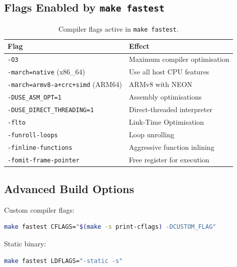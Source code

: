 \subsection{Flags Enabled by \texttt{make fastest}}
\label{sec:quickstart-flags}

\begin{table}[h]
  \centering
  \begin{tabular}{ll}
    \toprule
    Flag & Effect \\
    \midrule
    \texttt{-O3}                              & Maximum compiler optimisation \\
    \texttt{-march=native} (x86\_64)          & Use all host CPU features \\
    \texttt{-march=armv8-a+crc+simd} (ARM64) & ARMv8 with NEON \\
    \texttt{-DUSE\_ASM\_OPT=1}               & Assembly optimisations \\
    \texttt{-DUSE\_DIRECT\_THREADING=1}      & Direct-threaded interpreter \\
    \texttt{-flto}                            & Link-Time Optimisation \\
    \texttt{-funroll-loops}                   & Loop unrolling \\
    \texttt{-finline-functions}               & Aggressive function inlining \\
    \texttt{-fomit-frame-pointer}             & Free register for execution \\
    \bottomrule
  \end{tabular}
  \caption{Compiler flags active in \texttt{make fastest}.}
  \label{tab:quickstart-flags}
\end{table}

\subsection{Advanced Build Options}
\label{sec:quickstart-advanced}

Custom compiler flags:

\begin{lstlisting}[language=bash]
make fastest CFLAGS="$(make -s print-cflags) -DCUSTOM_FLAG"
\end{lstlisting}

Static binary:

\begin{lstlisting}[language=bash]
make fastest LDFLAGS="-static -s"
\end{lstlisting}


